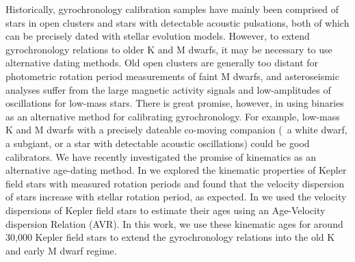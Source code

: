 Historically, gyrochronology calibration samples have mainly been comprised of
stars in open clusters and stars with detectable acoustic pulsations, both of
which can be precisely dated with stellar evolution models.
However, to extend gyrochronology relations to older K and M dwarfs, it may be
necessary to use alternative dating methods.
Old open clusters are generally too distant for photometric rotation period
measurements of faint M dwarfs, and asteroseismic analyses suffer from the
large magnetic activity signals and low-amplitudes of oscillations for
low-mass stars.
There is great promise, however, in using binaries as an alternative method
for calibrating gyrochronology.
For example, low-mass K and M dwarfs with a precisely dateable co-moving
companion (\eg\ a white dwarf, a subgiant, or a star with detectable acoustic
oscillations) could be good calibrators.
We have recently investigated the promise of kinematics as an alternative
age-dating method.
In \citet{angus2020} we explored the kinematic properties of Kepler field
stars with measured rotation periods and found that the velocity dispersion of
stars increase with stellar rotation period, as expected.
In \citet{lu2021} we used the velocity dispersions of Kepler field stars to
estimate their ages using an Age-Velocity dispersion Relation (AVR).
In this work, we use these kinematic ages for around 30,000 Kepler field
stars to extend the gyrochronology relations into the old K and early M dwarf
regime.

